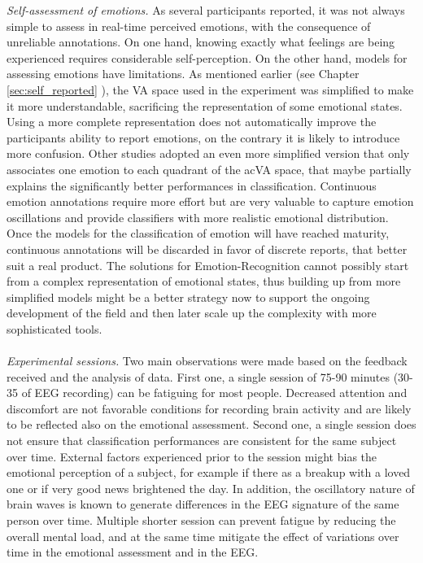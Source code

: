 \emph{Self-assessment of emotions.} As several participants reported, it was not always simple to assess in real-time perceived emotions, with the consequence of unreliable annotations. On one hand, knowing exactly what feelings are being experienced requires considerable self-perception. On the other hand, models for assessing emotions have limitations. As mentioned earlier (see Chapter \ref{sec:self_reported} ), the \ac{VA} space used in the experiment was simplified to make it more understandable, sacrificing the representation of some emotional states. Using a more complete representation does not automatically improve the participants ability to report emotions, on the contrary it is likely to introduce more confusion. Other studies \cite{lin_eeg-based_2010} adopted an even more simplified version that only associates one emotion to each quadrant of the ac{VA} space, that maybe partially explains the significantly better performances in classification. Continuous emotion annotations require more effort but are very valuable to capture emotion oscillations and provide classifiers with more realistic emotional distribution. Once the models for the classification of emotion will have reached maturity, continuous annotations will be discarded in favor of discrete reports, that better suit a real product. The solutions for Emotion-Recognition cannot possibly start from a complex representation of emotional states, thus building up from more simplified models might be a better strategy now to support the ongoing development of the field and then later scale up the complexity with more sophisticated tools.
\\
\\
\emph{Experimental sessions.} Two main observations were made based on the feedback received and the analysis of data. First one, a single session of 75-90 minutes (30-35 of \ac{EEG} recording) can be fatiguing for most people. Decreased attention and discomfort are not favorable conditions for recording brain activity and are likely to be reflected also on the emotional assessment. Second one, a single session does not ensure that classification performances are consistent for the same subject over time. External factors experienced prior to the session might bias the emotional perception of a subject, for example if there as a breakup with a loved one or if very good news brightened the day. In addition, the oscillatory nature of brain waves is known to generate differences in the \ac{EEG} signature of the same person over time. Multiple shorter session can prevent fatigue by reducing the overall mental load, and at the same time mitigate the effect of variations over time in the emotional assessment and in the \ac{EEG}.  

